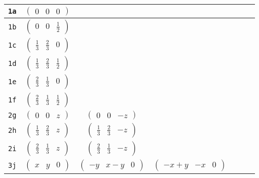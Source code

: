 \documentclass[fleqn,9pt,landscape]{jsarticle}
\begin{document}
\begin{center}
\begin{longtable}{ccccccc}
{\tt 1a} & $ \begin{pmatrix} 0 & 0 & 0 \end{pmatrix} $ & $  $ & $  $ & $  $ & $  $ & $  $ \\ \hline
{\tt 1b} & $ \begin{pmatrix} 0 & 0 & \frac{1}{2} \end{pmatrix} $ & $  $ & $  $ & $  $ & $  $ & $  $ \\ \hline
{\tt 1c} & $ \begin{pmatrix} \frac{1}{3} & \frac{2}{3} & 0 \end{pmatrix} $ & $  $ & $  $ & $  $ & $  $ & $  $ \\ \hline
{\tt 1d} & $ \begin{pmatrix} \frac{1}{3} & \frac{2}{3} & \frac{1}{2} \end{pmatrix} $ & $  $ & $  $ & $  $ & $  $ & $  $ \\ \hline
{\tt 1e} & $ \begin{pmatrix} \frac{2}{3} & \frac{1}{3} & 0 \end{pmatrix} $ & $  $ & $  $ & $  $ & $  $ & $  $ \\ \hline
{\tt 1f} & $ \begin{pmatrix} \frac{2}{3} & \frac{1}{3} & \frac{1}{2} \end{pmatrix} $ & $  $ & $  $ & $  $ & $  $ & $  $ \\ \hline
{\tt 2g} & $ \begin{pmatrix} 0 & 0 & z \end{pmatrix} $ & $ \begin{pmatrix} 0 & 0 & - z \end{pmatrix} $ & $  $ & $  $ & $  $ & $  $ \\ \hline
{\tt 2h} & $ \begin{pmatrix} \frac{1}{3} & \frac{2}{3} & z \end{pmatrix} $ & $ \begin{pmatrix} \frac{1}{3} & \frac{2}{3} & - z \end{pmatrix} $ & $  $ & $  $ & $  $ & $  $ \\ \hline
{\tt 2i} & $ \begin{pmatrix} \frac{2}{3} & \frac{1}{3} & z \end{pmatrix} $ & $ \begin{pmatrix} \frac{2}{3} & \frac{1}{3} & - z \end{pmatrix} $ & $  $ & $  $ & $  $ & $  $ \\ \hline
{\tt 3j} & $ \begin{pmatrix} x & y & 0 \end{pmatrix} $ & $ \begin{pmatrix} - y & x - y & 0 \end{pmatrix} $ & $ \begin{pmatrix} - x + y & - x & 0 \end{pmatrix} $ & $  $ & $  $ & $  $ \\ \hline

\end{longtable}
\end{center}
\end{document}
